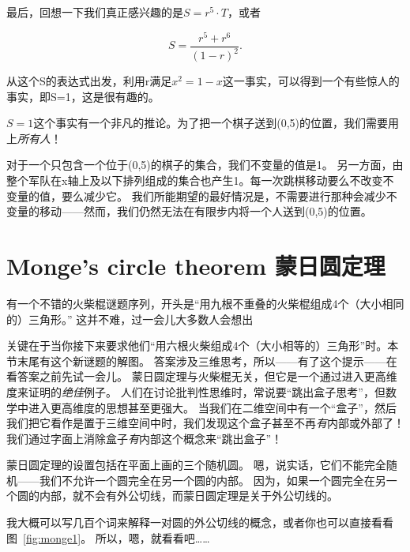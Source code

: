 最后，回想一下我们真正感兴趣的是$S = r^5 \cdot T$，或者

\[ S = \frac{r^5 + r^6}{(1-r)^2}. \]

从这个S的表达式出发，利用r满足$x^2 = 1 - x$这一事实，可以得到一个有些惊人的事实，即S=1，这是很有趣的。

$S=1$这个事实有一个非凡的推论。为了把一个棋子送到(0,5)的位置，我们需要用上\emph{所有人}！

对于一个只包含一个位于(0,5)的棋子的集合，我们不变量的值是1。
另一方面，由整个军队在x轴上及以下排列组成的集合也产生1。每一次跳棋移动要么不改变不变量的值，要么减少它。
我们所能期望的最好情况是，不需要进行那种会减少不变量的移动——然而，我们仍然无法在有限步内将一个人送到(0,5)的位置。

\clearpage




\newpage

\section{Monge's circle theorem 蒙日圆定理}
\label{sec:monge}

有一个不错的火柴棍谜题序列，开头是“用九根不重叠的火柴棍组成4个（大小相同的）三角形。” 这并不难，过一会儿大多数人会想出

\begin{center}

\end{center}

关键在于当你接下来要求他们“用六根火柴组成4个（大小相等的）三角形”时。本节末尾有这个新谜题的解图。
答案涉及三维思考，所以——有了这个提示——在看答案之前先试一会儿。
蒙日圆定理与火柴棍无关，但它是一个通过进入更高维度来证明的\emph{绝佳}例子。
人们在讨论批判性思维时，常说要“跳出盒子思考”，但数学中进入更高维度的思想甚至更强大。
当我们在二维空间中有一个“盒子”，然后我们把它看作是置于三维空间中时，我们发现这个盒子甚至不再\emph{有}内部或外部了！
我们通过字面上消除盒子\emph{有}内部这个概念来“跳出盒子”！

蒙日圆定理的设置包括在平面上画的三个随机圆。
嗯，说实话，它们不能完全随机——我们不允许一个圆完全在另一个圆的内部。
因为，如果一个圆完全在另一个圆的内部，就不会有外公切线，而蒙日圆定理是关于外公切线的。

我大概可以写几百个词来解释一对圆的外公切线的概念，或者你也可以直接看看图~\ref{fig:monge1}。
所以，嗯，就看看吧……

